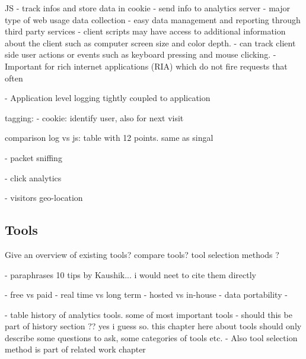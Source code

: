 JS
- track infos and store data in cookie
- send info to analytics server
- major type of web usage data collection
- easy data management and reporting through third party services
- client scripts may have access to additional information about the client such as computer screen size and color depth.
- can track client side user actions or events such as keyboard pressing and mouse clicking.
- Important for rich internet applications (RIA) which do not fire requests that often

- Application level logging
tightly coupled to application





tagging:
- cookie: identify user, also for next visit


comparison log vs js:
table with 12 points. same as singal




- packet sniffing

- click analytics

- visitors geo-location







\subsection{Tools}

Give an overview of existing tools?
compare tools?
tool selection methods ?


- paraphrases 10 tips by Kaushik... i would neet to cite them directly


- free vs paid
- real time vs long term
- hosted vs in-house
- data portability
- 




- table history of analytics tools. some of most important tools
- should this be part of history section ?? yes i guess so. this chapter here about tools should only describe some questions to ask, some categories of tools etc.
- Also tool selection method is part of related work chapter




